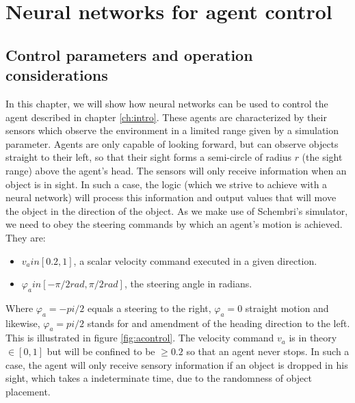 \documentclass[10pt,a4paper,DIV=11]{scrreprt}
\begin{document}
\chapter{Neural networks for agent control}
\label{ch:design}

\section{Control parameters and operation considerations}
In this chapter, we will show how neural networks can be used to control the agent described in chapter \ref{ch:intro}. These agents are 
characterized by their sensors which observe the environment in a limited range given by a simulation parameter. Agents are only capable 
of looking forward, but can observe
objects straight to their left, so that their sight forms a semi-circle of radius $r$ (the sight range) above the agent's head. The sensors will only 
receive information when an object is in sight. In such a case, the logic (which we strive to achieve with a neural network) will process
this information and output values that will move the object in the direction of the object. As we make use
of Schembri's simulator, we need to obey the steering commands by which an agent's motion is achieved. They are:

\begin{itemize}
    \item $v_a in [0.2,1]$, a scalar velocity command executed in a given direction.
    \item $\varphi_a in [-\pi/2 rad,\pi/2 rad]$, the steering angle in radians.
\end{itemize}

Where $\varphi_a = -pi/2$ equals a steering to the right, $\varphi_a = 0$ straight motion and likewise, $\varphi_a = pi/2$ stands for and amendment
of the heading direction to the left.
This is illustrated in figure \ref{fig:acontrol}. The velocity command $v_a$ is in theory $ \in [0,1]$ but will be confined to be $\geq 0.2$ so that
an agent never stops. In such a case, the agent will only receive sensory information if an object is dropped in his sight, which takes a indeterminate
time, due to the randomness of object placement.
\end{document}

